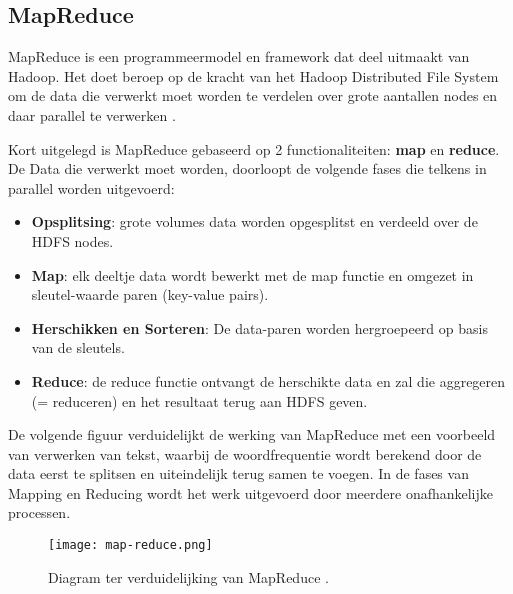 \subsection{MapReduce}
MapReduce is een programmeermodel en framework dat deel uitmaakt van Hadoop. Het doet beroep op de kracht van het Hadoop Distributed File System om de data die verwerkt moet worden te verdelen over grote aantallen nodes en daar parallel te verwerken \autocite{Talend2023}.

Kort uitgelegd is MapReduce gebaseerd op 2 functionaliteiten: \textbf{map} en \textbf{reduce}.
\newline
\newline
De Data die verwerkt moet worden, doorloopt de volgende fases die telkens in parallel worden uitgevoerd:
\begin{itemize}
    \item \textbf{Opsplitsing}: grote volumes data worden opgesplitst en verdeeld over de HDFS nodes.
    \item \textbf{Map}: elk deeltje data wordt bewerkt met de map functie en omgezet in sleutel-waarde paren (key-value pairs).
    \item \textbf{Herschikken en Sorteren}: De data-paren worden hergroepeerd op basis van de sleutels.
    \item \textbf{Reduce}: de reduce functie ontvangt de herschikte data en zal die aggregeren (= reduceren) en het resultaat terug aan HDFS geven.
\end{itemize}

De volgende figuur verduidelijkt de werking van MapReduce met een voorbeeld van verwerken van tekst, waarbij de woordfrequentie wordt berekend door de data eerst te splitsen en uiteindelijk terug samen te voegen. In de fases van Mapping en Reducing wordt  het werk uitgevoerd door meerdere onafhankelijke processen.
\begin{figure}[H]
    \texttt{[image: map-reduce.png]}
    \caption{Diagram ter verduidelijking van MapReduce \autocite{Anushkakhatri2022}.}
\end{figure}

